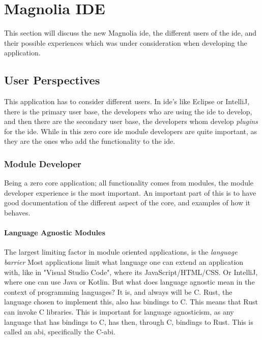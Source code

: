 \chapter{Magnolia IDE} \label{cha:ide}

This section will discuss the new Magnolia \gls{ide}, the different users of the
\gls{ide}, and their possible experiences which was under consideration when
developing the application.

\section{User Perspectives}

This application has to consider different users. In \gls{ide}'s like Eclipse or
IntelliJ, there is the primary user base, the developers who are using the
\gls{ide} to develop, and then there are the secondary user base, the developers
whom develop \textit{plugins} for the \gls{ide}. While in this zero core
\gls{ide} module developers are quite important, as they are the ones who add
the functionality to the \gls{ide}.

\subsection{Module Developer}

Being a zero core application; all functionality comes from modules, the module
developer experience is the most important. An important part of this is to have
good documentation of the different aspect of the core, and examples of how it
behaves.

\subsubsection{Language Agnostic Modules}

The largest limiting factor in module oriented applications, is the
\textit{language barrier} Most applications limit what language one can extend
an application with, like in "Visual Studio Code", where its
JavaScript/HTML/CSS. Or IntelliJ, where one can use Java or Kotlin. But what
does language agnostic mean in the context of programming languages? It is, and
always will be C. Rust, the language chosen to implement this, also has bindings
to C. This means that Rust can invoke C libraries. This is important for
language agnosticism, as any language that has bindings to C, has then, through
C, bindings to Rust. This is called an \gls{abi}, specifically the C-\gls{abi}.

